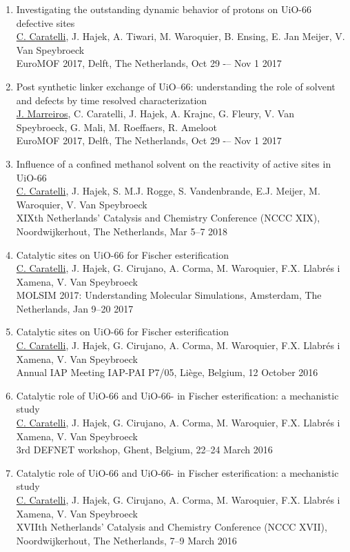 \begin{enumerate}
\item
Investigating the outstanding dynamic behavior of protons on UiO-66 defective sites\\
\underline{C. Caratelli}, J. Hajek, A. Tiwari, M. Waroquier, B. Ensing, E. Jan Meijer, V. Van Speybroeck\\ 
EuroMOF 2017, Delft, The Netherlands, Oct 29 -– Nov 1 2017

\item
Post synthetic linker exchange of UiO--66: understanding the role of solvent and defects by time resolved characterization\\
\underline{J. Marreiros}, C. Caratelli, J. Hajek, A. Krajnc, G. Fleury, V. Van Speybroeck, G. Mali, M. Roeffaers, R. Ameloot\\
EuroMOF 2017, Delft, The Netherlands, Oct 29 -– Nov 1 2017

\item	
Influence of a confined methanol solvent on the reactivity of active sites in UiO-66\\
\underline{C. Caratelli}, J. Hajek, S. M.J. Rogge, S. Vandenbrande, E.J. Meijer, M. Waroquier, V. Van Speybroeck\\ XIXth Netherlands' Catalysis and Chemistry Conference (NCCC XIX), Noordwijkerhout, The Netherlands, Mar 5--7 2018

\item
Catalytic sites on UiO-66 for Fischer esterification\\
\underline{C. Caratelli}, J. Hajek, G. Cirujano, A. Corma, M. Waroquier, F.X.
Llabr\'es i Xamena, V. Van Speybroeck\\
MOLSIM 2017: Understanding Molecular Simulations, Amsterdam, The Netherlands, Jan 9--20 2017

\item
Catalytic sites on UiO-66 for Fischer esterification\\
\underline{C. Caratelli}, J. Hajek, G. Cirujano, A. Corma, M. Waroquier, F.X.
Llabr\'es i Xamena, V. Van Speybroeck\\
Annual IAP Meeting IAP-PAI P7/05, Li\`ege, Belgium, 12 October 2016

\item
Catalytic role of UiO-66 and UiO-66- in Fischer esterification: a
mechanistic study\\
\underline{C. Caratelli}, J. Hajek, G. Cirujano, A. Corma, M. Waroquier, F.X.
Llabr\'es i Xamena, V. Van Speybroeck\\
3rd DEFNET workshop, Ghent, Belgium, 22--24 March 2016

\item
Catalytic role of UiO-66 and UiO-66- in Fischer esterification: a
mechanistic study\\
\underline{C. Caratelli}, J. Hajek, G. Cirujano, A. Corma, M. Waroquier, F.X.
Llabr\'es i Xamena, V. Van Speybroeck\\
XVIIth Netherlands' Catalysis and Chemistry Conference (NCCC XVII),
Noordwijkerhout, The Netherlands, 7--9 March 2016

\end{enumerate}
\clearpage{\pagestyle{empty}\cleardoublepage}
